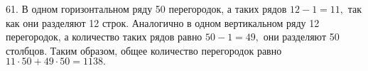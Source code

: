 61. В одном горизонтальном ряду 50 перегородок, а таких рядов $12-1=11,$ так как они разделяют 12 строк. Аналогично в одном вертикальном ряду 12 перегородок, а количество таких рядов равно $50-1=49,$ они разделяют 50 столбцов. Таким образом, общее количество перегородок равно $11\cdot50+49\cdot50=1138.$\\
